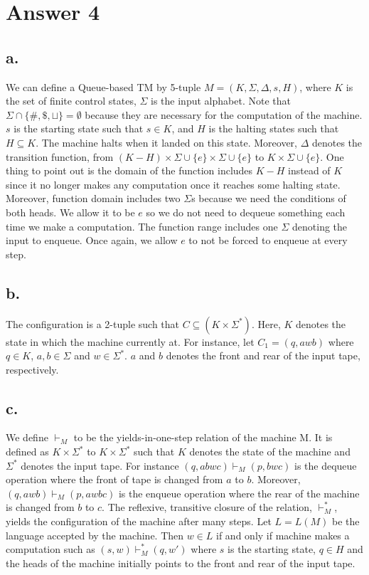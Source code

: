 \documentclass[12pt]{article}
\begin{document}
\section*{Answer 4}

\subsection*{a.}
We can define a Queue-based TM by 5-tuple $M=(K,\Sigma, \Delta, s, H)$,  where $K$ is the set of finite control states, $\Sigma$ is the input alphabet. Note that $\Sigma \cap \{\#,\$,\sqcup\}=\emptyset$ because they are necessary for the computation of the machine. $s$ is the starting state such that $s\in K$, and $H$ is the halting states such that $H\subseteq K$. The machine halts when it landed on this state. Moreover, $\Delta$ denotes the transition function, from $(K-H)\times \Sigma\cup\{e\} \times \Sigma\cup\{e\}$ to $K \times \Sigma\cup\{e\}$. One thing to point out is the domain of the function includes $K-H$ instead of $K$ since it no longer makes any computation once it reaches some halting state. Moreover, function domain includes two $\Sigma$s because we need the conditions of both heads. We allow it to be $e$ so we do not need to dequeue something each time we make a computation. The function range includes one $\Sigma$ denoting the input to enqueue. Once again, we allow $e$ to not be forced to enqueue at every step.
\subsection*{b.}
The configuration is a 2-tuple such that $C\subseteq (K\times\Sigma^*)$. Here, $K$ denotes the state in which the machine currently at.  For instance, let $C_1 = (q, awb)$ where $q\in K$, $a,b\in\Sigma$ and $w\in\Sigma^*$. $a$ and $b$ denotes the front and rear of the input tape, respectively.
\subsection*{c.}
We define $\vdash_M$ to be the yields-in-one-step relation of the machine M. It is defined as $K\times \Sigma^*$ to $K\times\Sigma^*$ such that  $K$ denotes the state of the machine and $\Sigma^*$ denotes the input tape. For instance $(q, abwc)\vdash_M(p, bwc)$ is the dequeue operation where the front of tape is changed from $a$ to $b$. Moreover, $(q,awb)\vdash_M (p, awbc)$ is the enqueue operation where the rear of the machine is changed from $b$ to $c$. The reflexive, transitive closure of the relation, $\vdash^*_M$, yields the configuration of the machine after many steps. Let $L=L(M)$ be the language accepted by the machine. Then $w\in L$ if and only if machine makes a computation such as $(s,w)\vdash^*_M(q,w')$ where $s$ is the starting state, $q\in H$ and the heads of the machine initially points to the front and rear of the input tape.
\end{document}
